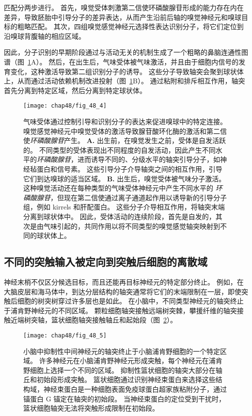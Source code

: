 匹配分两步进行。
首先，嗅觉受体刺激第二信使环磷酸腺苷形成的能力存在内在差异，导致胚胎中引导分子的差异表达，从而产生沿前后轴的嗅觉神经元和嗅球目标的粗略匹配。
其次，四组嗅觉感觉神经元选择性表达识别分子，将它们定位到沿嗅球背腹轴的相应区域。


因此，分子识别的早期阶段通过与活动无关的机制生成了一个粗略的鼻脑连通性图谱（图~\ref{fig:48_4}A）。
然后，在出生后，气味受体被气味激活，并且由于细胞内信号的发育变化，这种激活导致第二组识别分子的诱导。
这些分子导致轴突会聚到球状体上，从而通过活动依赖机制改进投射（图~\ref{fig:48_4}B）。
通过粘附和排斥相互作用，轴突首先分离到特定区域，然后分离到特定球状体。


\begin{figure}[htbp]
	\centering
	\texttt{[image: chap48/fig\_48\_4]}
	\caption{气味受体通过控制引导和识别分子的表达来促进嗅球中的特定连接。
		嗅觉感觉神经元中嗅觉受体的激活导致腺苷酸环化酶的激活和第二信使\textit{环磷酸腺苷}产生。
		\textbf{A.} 出生前，在嗅觉发生之前，受体是自发活跃的。
		不同类型的受体表现出不同程度的自发活动，因此产生不同水平的\textit{环磷酸腺苷}，进而诱导不同的、分级水平的轴突引导分子，如神经毡蛋白和信号素。
		这些引导分子介导轴突之间的相互作用，引导它们到达嗅球的适当区域。
		\textbf{B.} 出生后，嗅觉受体被气味分子激活。这种嗅觉活动还在每种类型的气味受体神经元中产生不同水平的 \textit{环磷酸腺苷}，但现在第二信使通过离子通道起作用以诱导新的引导分子组，例如 kirrels 和肝配蛋白。
		这些分子介导相互作用，将轴突末端分离到球状体中。
		因此，受体活动的连续阶段，首先是自发的，其次是由气味引起的，共同作用以将不同类型的嗅觉感觉轴突映射到不同的球状体上。}
	\label{fig:48_4}
\end{figure}



\subsection{不同的突触输入被定向到突触后细胞的离散域}


神经末梢不仅区分候选目标，而且还能再目标神经元的特定部分终止。
例如，在大脑皮层和海马体中，到达分层结构的轴突通常将它们的末端限制在一层，即使突触后细胞的树突树穿过许多层也是如此。
在小脑中，不同类型神经元的轴突终止于浦肯野神经元的不同区域。
颗粒细胞轴突接触远端树突棘，攀援纤维的轴突接触近端树突轴，篮状细胞轴突接触轴丘和起始段（图~\ref{fig:48_5}）。


\begin{figure}[htbp]
	\centering
	\texttt{[image: chap48/fig\_48\_5]}
	\caption{小脑中抑制性中间神经元的轴突终止于小脑浦肯野细胞的一个特定区域。
		许多神经元在小脑浦肯野神经元形成突触，每个神经元在浦肯野细胞上选择一个不同的区域。
		抑制性篮状细胞的轴突大部分在轴丘和初始段形成突触。
		篮状细胞通过识别神经束蛋白来选择这些结构域，神经束蛋白是一种细胞表面免疫球蛋白超家族粘附分子，通过锚蛋白 G 锚定在轴突的初始段。
		当神经束蛋白的定位受到干扰时，篮状细胞轴突无法将突触形成限制在初始段\cite{huang2006subcellular}。}
	\label{fig:48_5}
\end{figure}


